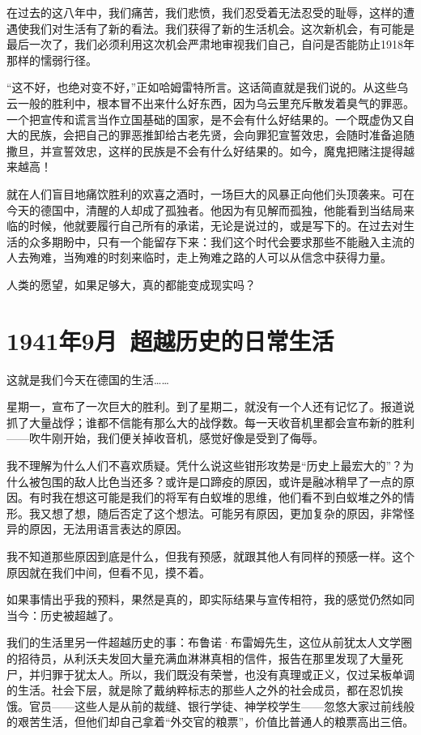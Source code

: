 \documentclass[UTF8]{ctexart}
\begin{document}
在过去的这八年中，我们痛苦，我们悲愤，我们忍受着无法忍受的耻辱，这样的遭遇使我们对生活有了新的看法。我们获得了新的生活机会。这次新机会，有可能是最后一次了，我们必须利用这次机会严肃地审视我们自己，自问是否能防止1918年那样的懦弱行径。

“这不好，也绝对变不好，”正如哈姆雷特所言。这话简直就是我们说的。从这些乌云一般的胜利中，根本冒不出来什么好东西，因为乌云里充斥散发着臭气的罪恶。一个把宣传和谎言当作立国基础的国家，是不会有什么好结果的。一个既虚伪又自大的民族，会把自己的罪恶推卸给古老先贤，会向罪犯宣誓效忠，会随时准备追随撒旦，并宣誓效忠，这样的民族是不会有什么好结果的。如今，魔鬼把赌注提得越来越高！

就在人们盲目地痛饮胜利的欢喜之酒时，一场巨大的风暴正向他们头顶袭来。可在今天的德国中，清醒的人却成了孤独者。他因为有见解而孤独，他能看到当结局来临的时候，他就要履行自己所有的承诺，无论是说过的，或是写下的。在过去对生活的众多期盼中，只有一个能留存下来：我们这个时代会要求那些不能融入主流的人去殉难，当殉难的时刻来临时，走上殉难之路的人可以从信念中获得力量。

人类的愿望，如果足够大，真的都能变成现实吗？

\section{1941年9月\ 超越历史的日常生活}

这就是我们今天在德国的生活……

星期一，宣布了一次巨大的胜利。到了星期二，就没有一个人还有记忆了。报道说抓了大量战俘；谁都不信能有那么大的战俘数。每一天收音机里都会宣布新的胜利——吹牛刚开始，我们便关掉收音机，感觉好像是受到了侮辱。

我不理解为什么人们不喜欢质疑。凭什么说这些钳形攻势是“历史上最宏大的”？为什么被包围的敌人比色当还多？或许是口蹄疫的原因，或许是融冰稍早了一点的原因。有时我在想这可能是我们的将军有白蚁堆的思维，他们看不到白蚁堆之外的情形。我又想了想，随后否定了这个想法。可能另有原因，更加复杂的原因，非常怪异的原因，无法用语言表达的原因。

我不知道那些原因到底是什么，但我有预感，就跟其他人有同样的预感一样。这个原因就在我们中间，但看不见，摸不着。

如果事情出乎我的预料，果然是真的，即实际结果与宣传相符，我的感觉仍然如同当今：历史被超越了。

我们的生活里另一件超越历史的事：布鲁诺·布雷姆先生，这位从前犹太人文学圈的招待员，从利沃夫发回大量充满血淋淋真相的信件，报告在那里发现了大量死尸，并归罪于犹太人。所以，我们既没有荣誉，也没有真理或正义，仅过呆板单调的生活。社会下层，就是除了戴纳粹标志的那些人之外的社会成员，都在忍饥挨饿。官员——这些人是从前的裁缝、银行学徒、神学校学生——忽悠大家过前线般的艰苦生活，但他们却自己拿着“外交官的粮票”，价值比普通人的粮票高出三倍。
\end{document}
